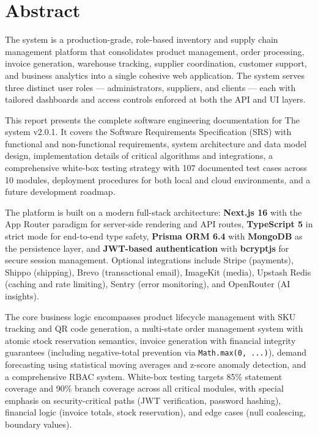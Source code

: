 ﻿\documentclass[12pt,a4paper]{report}
\begin{document}
\chapter*{Abstract}

\begin{tcolorbox}[infobox,title={Executive Summary}]
The system is a production-grade, role-based inventory and supply chain management platform that consolidates product management, order processing, invoice generation, warehouse tracking, supplier coordination, customer support, and business analytics into a single cohesive web application. The system serves three distinct user roles --- administrators, suppliers, and clients --- each with tailored dashboards and access controls enforced at both the API and UI layers.
\end{tcolorbox}

This report presents the complete software engineering documentation for The system v2.0.1. It covers the Software Requirements Specification (SRS) with functional and non-functional requirements, system architecture and data model design, implementation details of critical algorithms and integrations, a comprehensive white-box testing strategy with 107 documented test cases across 10 modules, deployment procedures for both local and cloud environments, and a future development roadmap.

The platform is built on a modern full-stack architecture: \textbf{Next.js 16} with the App Router paradigm for server-side rendering and API routes, \textbf{TypeScript 5} in strict mode for end-to-end type safety, \textbf{Prisma ORM 6.4} with \textbf{MongoDB} as the persistence layer, and \textbf{JWT-based authentication} with \textbf{bcryptjs} for secure session management. Optional integrations include Stripe (payments), Shippo (shipping), Brevo (transactional email), ImageKit (media), Upstash Redis (caching and rate limiting), Sentry (error monitoring), and OpenRouter (AI insights).

The core business logic encompasses product lifecycle management with SKU tracking and QR code generation, a multi-state order management system with atomic stock reservation semantics, invoice generation with financial integrity guarantees (including negative-total prevention via \texttt{Math.max(0, ...)}), demand forecasting using statistical moving averages and z-score anomaly detection, and a comprehensive RBAC system. White-box testing targets 85\% statement coverage and 90\% branch coverage across all critical modules, with special emphasis on security-critical paths (JWT verification, password hashing), financial logic (invoice totals, stock reservation), and edge cases (null coalescing, boundary values).
\end{document}
